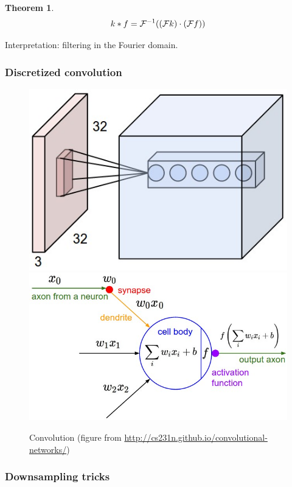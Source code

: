 \documentclass{article}
\newtheorem{theorem}{Theorem}
\begin{document}
\begin{theorem}
\[
k * f = {\mathcal F}^{-1} (({\mathcal F} k) \cdot ({\mathcal F} f))
\]
\end{theorem}

Interpretation: filtering in the Fourier domain.

\subsubsection{Discretized convolution}

\begin{figure}
\includegraphics[scale=0.2]{depthcol}
\includegraphics[scale=0.2]{neuron_model}
\caption{Convolution (figure from \url{http://cs231n.github.io/convolutional-networks/})}
\end{figure}

\subsubsection{Downsampling tricks}
\end{document}
